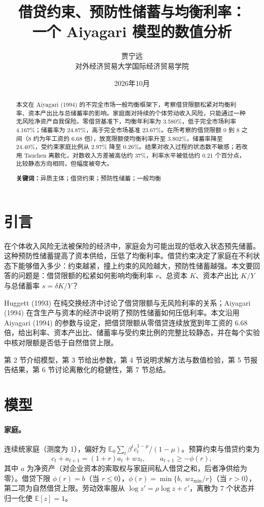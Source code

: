 \documentclass[11pt,a4paper]{ctexart}
\title{借贷约束、预防性储蓄与均衡利率：\\一个 Aiyagari 模型的数值分析}
\author{贾宁远\\对外经济贸易大学国际经济贸易学院}
\date{2026年10月}
\begin{document}
\maketitle

\begin{abstract}
本文在 Aiyagari (1994) 的不完全市场一般均衡框架下，考察借贷限额松紧对均衡利率、资本产出比与总储蓄率的影响。家庭面对持续的个体劳动收入风险，只能通过一种无风险净资产自我保险。零借贷基准下，均衡年利率为 3.580\%，低于完全市场利率 4.167\%；储蓄率为 24.87\%，高于完全市场基准 23.67\%。在所考察的借贷限额 0 到 8 之间（8 约为年工资的 6.68 倍），放宽限额使均衡利率升至 3.802\%，储蓄率降至 24.40\%，受约束家庭比例从 2.97\% 降至 0.26\%。结果对收入过程的状态数不敏感；若改用 Tauchen 离散化，对数收入方差被高估约 37\%，利率水平被低估约 0.21 个百分点，比较静态方向相同，但幅度被夸大。

\noindent\textbf{关键词：}异质主体；借贷约束；预防性储蓄；一般均衡
\end{abstract}

\section{引言}

在个体收入风险无法被保险的经济中，家庭会为可能出现的低收入状态预先储蓄。这种预防性储蓄提高了资本供给，压低了均衡利率。借贷约束决定了家庭在不利状态下能够借入多少：约束越紧，撞上约束的风险越大，预防性储蓄越强。本文要回答的问题是：借贷限额的松紧如何影响均衡利率 $r$、总资本 $K$、资本产出比 $K/Y$ 与总储蓄率 $s=\delta K/Y$？

Huggett (1993) 在纯交换经济中讨论了借贷限额与无风险利率的关系；Aiyagari (1994) 在含生产与资本的经济中说明了预防性储蓄如何压低利率。本文沿用 Aiyagari (1994) 的参数与设定，把借贷限额从零借贷连续放宽到年工资的 6.68 倍，给出利率、资本产出比、储蓄率与受约束比例的完整比较静态，并在每个实验中核对限额是否低于自然借贷上限。

第 2 节介绍模型，第 3 节给出参数，第 4 节说明求解方法与数值检验，第 5 节报告结果，第 6 节讨论离散化的稳健性，第 7 节总结。

\section{模型}

\paragraph{家庭。} 连续统家庭（测度为 1），偏好为 $\mathbb{E}_0\sum_t \beta^t c_t^{1-\mu}/(1-\mu)$。预算约束与借贷约束为
\begin{equation}
c_t + a_{t+1} = (1+r)a_t + w z_t,\qquad a_{t+1}\ge -\phi(r),
\end{equation}
其中 $a$ 为净资产（对企业资本的索取权与家庭间私人借贷之和，后者净供给为零）。借贷下限 $\phi(r)=b$（当 $r\le 0$），$\phi(r)=\min\{b,\ w z_{\min}/r\}$（当 $r>0$），第二项为自然借贷上限。劳动效率服从 $\log z'=\rho\log z+\varepsilon'$，离散为 7 个状态并归一化使 $\mathbb{E}[z]=1$。
\end{document}
